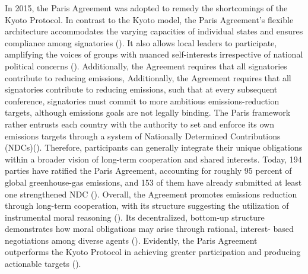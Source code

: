 \documentclass[12pt, a4paper, twoside]{article}
\begin{document}
In 2015, the Paris Agreement was adopted to remedy the shortcomings of the Kyoto Protocol. In contrast to the Kyoto model, the Paris Agreement’s flexible architecture accommodates the varying capacities of individual states and ensures compliance among signatories (\cite[p.\ 150]{moehler2020climate}). It also allows local leaders to participate, amplifying the voices of groups with nuanced self-interests irrespective of national political concerns (\cites{broto2022}[p.\ 67]{skjaersethetal2021}[p.\ 151]{moehler2020climate}). Additionally, the Agreement requires that all signatories contribute to reducing emissions, Additionally, the Agreement requires that all signatories contribute to reducing emissions, such that at every subsequent conference, signatories must commit to more ambitious emissions-reduction targets, although emissions goals are not legally binding. The Paris framework rather entrusts each country with the authority to set and enforce its own emissions targets through a system of Nationally Determined Contributions (NDCs)(\cite[pp.\ 9–10]{maslin-nodate}). Therefore, participants can generally integrate their unique obligations within a broader vision of long-term cooperation and shared interests. Today, 194 parties have ratified the Paris Agreement, accounting for roughly 95 percent of global greenhouse-gas emissions, and 153 of them have already submitted at least one strengthened NDC (\cite{unfccc2024ndc}). Overall, the Agreement promotes emissions reduction through long-term cooperation, with its structure suggesting the utilization of instrumental moral reasoning (\cites[pp.\ 5–6]{maslin-nodate}[p.\ 140]{moehler2020climate}{unitednationsclimate2025}). Its decentralized, bottom-up structure demonstrates how moral obligations may arise through rational, interest- based negotiations among diverse agents (\cite{skjaersethetal2021}). Evidently, the Paris Agreement outperforms the Kyoto Protocol in achieving greater participation and producing actionable targets (\cites{zeyrek2021}{tachibana2017}{green2024}).
\end{document}
